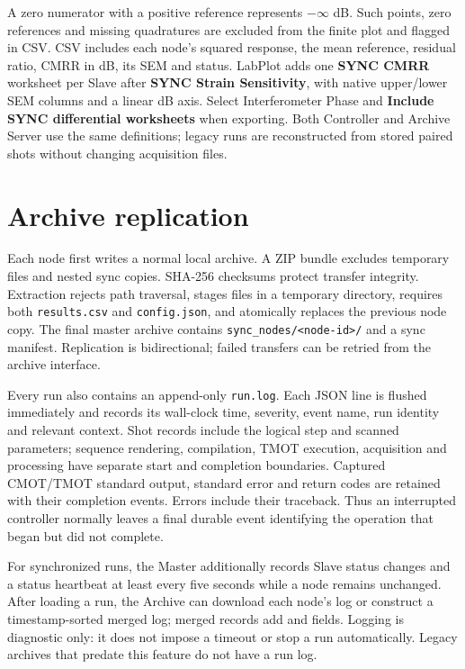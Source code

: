 \documentclass[11pt,oneside,openany]{book}
\newcommand{\code}[1]{\texttt{\detokenize{#1}}}
\newcommand{\ui}[1]{\textbf{#1}}
\newcommand{\pathcode}[1]{\nolinkurl{#1}}
\begin{document}
A zero numerator with a positive reference represents $-\infty$ dB. Such points,
zero references and missing quadratures are excluded from the finite plot and flagged
in CSV. CSV includes each node's squared response, the mean reference, residual ratio,
CMRR in dB, its SEM and status. LabPlot adds one \ui{SYNC CMRR} worksheet per Slave
after \ui{SYNC Strain Sensitivity}, with native upper/lower SEM columns and a linear
dB axis. Select Interferometer Phase and \ui{Include SYNC differential worksheets}
when exporting. Both Controller and Archive Server use the same definitions; legacy
runs are reconstructed from stored paired shots without changing acquisition files.

\section{Archive replication}
Each node first writes a normal local archive. A ZIP bundle excludes temporary files and
nested sync copies. SHA-256 checksums protect transfer integrity. Extraction rejects path
traversal, stages files in a temporary directory, requires both \pathcode{results.csv} and
\pathcode{config.json}, and atomically replaces the previous node copy. The final master
archive contains \pathcode{sync_nodes/<node-id>/} and a sync manifest. Replication is
bidirectional; failed transfers can be retried from the archive interface.

Every run also contains an append-only \pathcode{run.log}. Each JSON line is flushed
immediately and records its wall-clock time, severity, event name, run identity and
relevant context. Shot records include the logical step and scanned parameters; sequence
rendering, compilation, TMOT execution, acquisition and processing have separate start
and completion boundaries. Captured CMOT/TMOT standard output, standard error and return
codes are retained with their completion events. Errors include their traceback. Thus an
interrupted controller normally leaves a final durable event identifying the operation
that began but did not complete.

For synchronized runs, the Master additionally records Slave status changes and a status
heartbeat at least every five seconds while a node remains unchanged. After loading a run,
the Archive can download each node's log or construct a timestamp-sorted merged log;
merged records add \code{source_node} and \code{source_line} fields. Logging is diagnostic
only: it does not impose a timeout or stop a run automatically. Legacy archives that
predate this feature do not have a run log.
\end{document}
